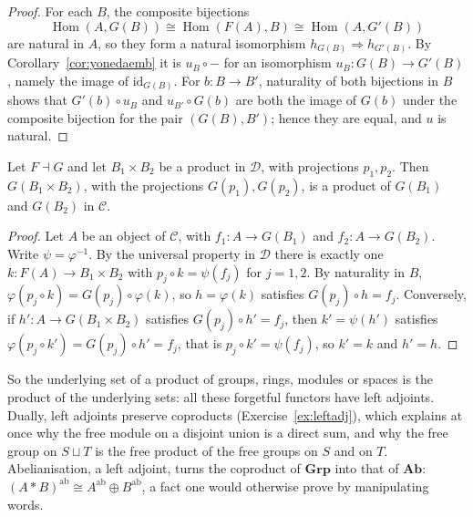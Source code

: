 \begin{proof}
For each $B$, the composite bijections
\[\operatorname{Hom}(A,G(B))\cong\operatorname{Hom}(F(A),B)\cong\operatorname{Hom}(A,G'(B))\]
are natural in $A$, so they form a natural isomorphism $h_{G(B)}\Rightarrow h_{G'(B)}$. By
Corollary~\ref{cor:yonedaemb} it is $u_B\circ-$ for an isomorphism $u_B\colon G(B)\to G'(B)$, namely the image of $\mathrm{id}_{G(B)}$. For $b\colon B\to B'$, naturality of both bijections in $B$ shows that
$G'(b)\circ u_B$ and $u_{B'}\circ G(b)$ are both the image of $G(b)$ under the composite bijection for the pair $(G(B),B')$; hence they are equal, and $u$ is natural.
\end{proof}

\begin{theorem}\label{thm:rapl}
Let $F\dashv G$ and let $B_1\times B_2$ be a product in $\mathcal D$, with projections $p_1,p_2$. Then $G(B_1\times B_2)$, with the projections $G(p_1),G(p_2)$, is a product of $G(B_1)$ and $G(B_2)$ in $\mathcal C$.
\end{theorem}

\begin{proof}
Let $A$ be an object of $\mathcal C$, with $f_1\colon A\to G(B_1)$ and $f_2\colon A\to G(B_2)$. Write $\psi=\varphi^{-1}$. By the universal property in $\mathcal D$ there is exactly one $k\colon F(A)\to B_1\times B_2$ with $p_j\circ k=\psi(f_j)$
for $j=1,2$. By naturality in $B$, $\varphi(p_j\circ k)=G(p_j)\circ\varphi(k)$, so $h=\varphi(k)$ satisfies $G(p_j)\circ h=f_j$. Conversely, if $h'\colon A\to G(B_1\times B_2)$ satisfies $G(p_j)\circ h'=f_j$, then
$k'=\psi(h')$ satisfies $\varphi(p_j\circ k')=G(p_j)\circ h'=f_j$, that is $p_j\circ k'=\psi(f_j)$, so $k'=k$ and $h'=h$.
\end{proof}

So the underlying set of a product of groups, rings, modules or spaces is the product of the underlying sets: all these forgetful functors have left adjoints. Dually, left adjoints preserve coproducts
(Exercise~\ref{ex:leftadj}), which explains at once why the free module on a disjoint union is a direct sum, and why the free group on $S\sqcup T$ is the free product of the free groups on $S$ and on $T$.
Abelianisation, a left adjoint, turns the coproduct of $\mathbf{Grp}$ into that of $\mathbf{Ab}$: $(A*B)^{\mathrm{ab}}\cong A^{\mathrm{ab}}\oplus B^{\mathrm{ab}}$, a fact one would otherwise prove by manipulating words.

